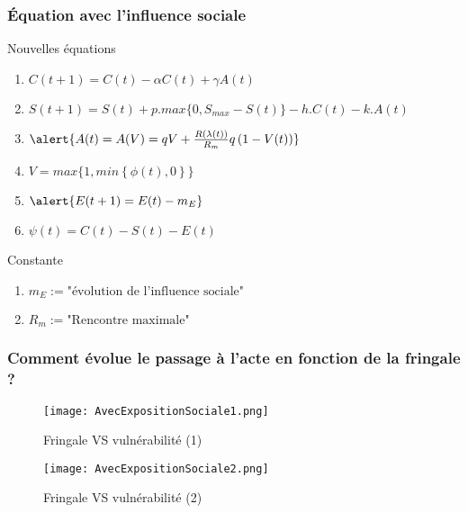 \documentclass{beamer}
\begin{document}
\begin{frame}
	\frametitle{Équation avec l'influence sociale}
	\begin{block}{Nouvelles équations}
		\begin{enumerate}
			\item $C(t+1) = C(t)- \alpha C(t) + \gamma A(t)$
			\item $S(t+1)=S(t)+p.max\{0,S_{max}-S(t)\}-h.C(t)-k.A(t)$
			\item $\alert{A(t)=A(V)=qV+\frac{R(\lambda(t))}{R_m}q\left( 1-V(t)\right) }$
			\item $V= max\{1,min\left\lbrace \phi(t),0 \right\rbrace \}$
			\item $\alert{E(t+1)=E(t)-m_E}$
			\item $\psi(t)=C(t)-S(t)-E(t)$
		\end{enumerate}
	\end{block}
	\begin{block}{Constante}
		\begin{enumerate}
			\item $m_E:=\text{"évolution de l'influence sociale"}$ 
			\item $R_m:=\text{"Rencontre maximale"}$
		\end{enumerate}
	\end{block}
\end{frame}

\begin{frame}
	\frametitle{Comment évolue le passage à l'acte en fonction de la fringale ?}
	\begin{minipage}{0.45\linewidth}
		\centering
		\begin{figure}
			\texttt{[image: AvecExpositionSociale1.png]}
			\captionsetup{justification=centering, skip=5pt}
			\caption{Fringale VS vulnérabilité (1)}
		\end{figure}
	\end{minipage}\hfill
	\begin{minipage}{0.45\linewidth}
		\centering
		\begin{figure}
			\texttt{[image: AvecExpositionSociale2.png]}
			\captionsetup{justification=centering, skip=5pt}
			\caption{Fringale VS vulnérabilité (2)}
		\end{figure}
	\end{minipage}
\end{frame}
\end{document}
